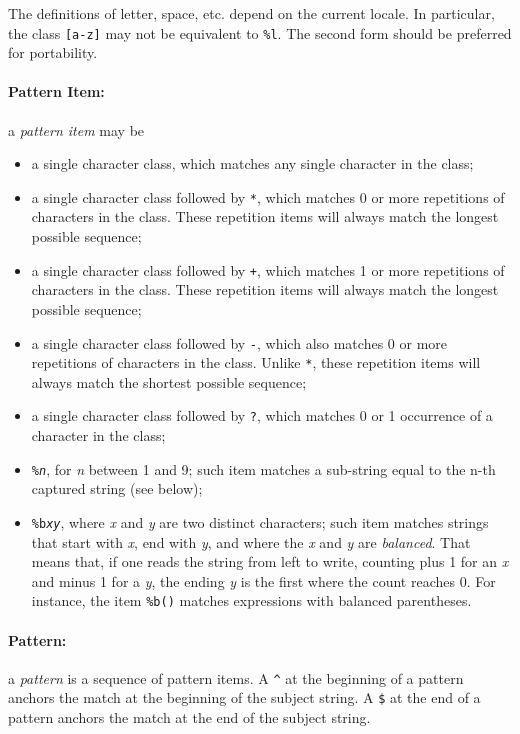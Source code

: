 \documentclass[11pt]{article}
\newcommand{\M}[1]{\emph{#1}}
\newcommand{\T}[1]{{\tt #1}}
\newcommand{\Def}[1]{\emph{#1}\index{#1}}
\begin{document}
The definitions of letter, space, etc. depend on the current locale.
In particular, the class \verb|[a-z]| may not be equivalent to \verb|%l|.
The second form should be preferred for portability.

\paragraph{Pattern Item:}
a \Def{pattern item} may be
\begin{itemize}
\item
a single character class,
which matches any single character in the class;
\item
a single character class followed by \verb|*|,
which matches 0 or more repetitions of characters in the class.
These repetition items will always match the longest possible sequence;
\item
a single character class followed by \verb|+|,
which matches 1 or more repetitions of characters in the class.
These repetition items will always match the longest possible sequence;
\item
a single character class followed by \verb|-|,
which also matches 0 or more repetitions of characters in the class.
Unlike \verb|*|,
these repetition items will always match the shortest possible sequence;
\item
a single character class followed by \verb|?|,
which matches 0 or 1 occurrence of a character in the class;
\item
\T{\%\M{n}}, for \M{n} between 1 and 9;
such item matches a sub-string equal to the n-th captured string
(see below);
\item
\T{\%b\M{xy}}, where \M{x} and \M{y} are two distinct characters;
such item matches strings that start with \M{x}, end with \M{y},
and where the \M{x} and \M{y} are \emph{balanced}.
That means that, if one reads the string from left to write,
counting plus 1 for an \M{x} and minus 1 for a \M{y},
the ending \M{y} is the first where the count reaches 0.
For instance, the item \verb|%b()| matches expressions with
balanced parentheses.
\end{itemize}

\paragraph{Pattern:}
a \Def{pattern} is a sequence of pattern items.
A \verb|^| at the beginning of a pattern anchors the match at the
beginning of the subject string.
A \verb|$| at the end of a pattern anchors the match at the
end of the subject string.
\end{document}

